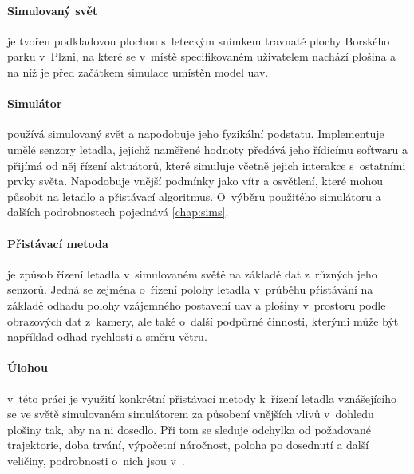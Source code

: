 \paragraph{Simulovaný svět} je tvořen podkladovou plochou s~leteckým snímkem travnaté plochy Borského parku v~Plzni, na které se v~místě specifikovaném uživatelem nachází plošina a na níž je před začátkem simulace umístěn model \acrshort{uav}.

\paragraph{Simulátor} používá simulovaný svět a napodobuje jeho fyzikální podstatu. Implementuje umělé senzory letadla, jejichž naměřené hodnoty předává jeho řídicímu softwaru a přijímá od něj řízení aktuátorů, které simuluje včetně jejich interakce s~ostatními prvky světa. Napodobuje vnější podmínky jako vítr a osvětlení, které mohou působit na letadlo a přistávací algoritmus. O~výběru použitého simulátoru a dalších podrobnostech pojednává \cref{chap:sims}.

\paragraph{Přistávací metoda} je způsob řízení letadla v~simulovaném světě na základě dat z~různých jeho senzorů. Jedná se zejména o~řízení polohy letadla v~průběhu přistávání na základě odhadu polohy vzájemného postavení \acrshort{uav} a plošiny v~prostoru podle obrazových dat z~kamery, ale také o~další podpůrné činnosti, kterými může být například odhad rychlosti a směru větru.

\paragraph{Úlohou} v~této práci je využití konkrétní přistávací metody k~řízení letadla vznášejícího se ve světě simulovaném simulátorem za působení vnějších vlivů v~dohledu plošiny tak, aby na ni dosedlo. Při tom se sleduje odchylka od požadované trajektorie, doba trvání, výpočetní náročnost, poloha po dosednutí a další veličiny, podrobnosti o~nich jsou v~.